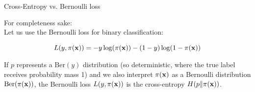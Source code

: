 \documentclass[11pt,compress,t,notes=noshow, xcolor=table]{beamer}
\begin{document}

  
  

\begin{vbframe}{Cross-Entropy vs. Bernoulli loss}
    
For completeness sake:\\
  Let us use the Bernoulli loss for binary classification: 

  $$L(y,\pi(\mathbf{x})) = -y \log(\pi(\mathbf{x})) - (1 - y) \log (1 - \pi(\mathbf{x}))$$

\lz

  If $p$ represents a $\text{Ber}(y)$ distribution (so deterministic, where the true label receives probability mass 1) and we also interpret $\pi(\mathbf{x})$ as a Bernoulli distribution $\text{Ber}(\pi(\mathbf{x}))$, the Bernoulli loss $L(y,\pi(\mathbf{x}))$ is the cross-entropy $H(p \| \pi(\mathbf{x}))$.
\end{vbframe}
\end{document}
